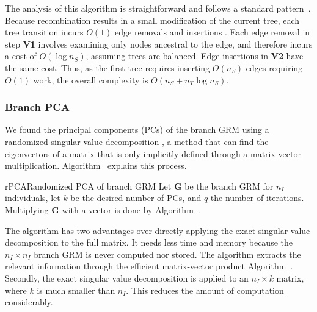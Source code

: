 The analysis of this algorithm is straightforward and follows  a standard 
pattern~\citep{kelleher2016efficient,ralph2020efficiently}. Because
recombination results in a small modification of the current tree,
each tree transition
incurs $O(1)$ edge removals and insertions . Each edge removal in step \textbf{V1}
involves examining only nodes ancestral to the edge, and therefore incurs
a cost of $O(\log{n_S})$, assuming trees are balanced. Edge insertions
in \textbf{V2} have the same cost. Thus, 
as the first tree requires inserting $O(n_S)$ edges requiring $O(1)$
work, the overall complexity is $O(n_S + n_T \log{n_S})$.


\subsubsection{Branch PCA}

We found the principal components (PCs) of the branch GRM
using a randomized singular value decomposition \citep{halko2011findingstructure},
a method that can find the
eigenvectors of a matrix that is only implicitly defined through a matrix-vector multiplication.
Algorithm~ explains this process.

\begin{taocpalg}{rPCA}{Randomized PCA of branch GRM}
{
    Let $\mathbf{G}$ be the branch GRM for $n_I$ individuals,
    let $k$ be the desired number of PCs, and $q$ the number of iterations.
    Multiplying $\mathbf{G}$ with a vector is done by Algorithm~.
}



The algorithm has two advantages over directly applying the exact singular value decomposition to the full matrix.
%
It needs less time and memory because the $n_I \times n_I$ branch GRM is never computed nor stored.
%
The algorithm extracts the relevant information through
the efficient matrix-vector product Algorithm~.
%
Secondly, the exact singular value decomposition is applied to an $n_I \times k$ matrix,
where $k$ is much smaller than $n_I$.
%
This reduces the amount of computation considerably.

\end{taocpalg}


